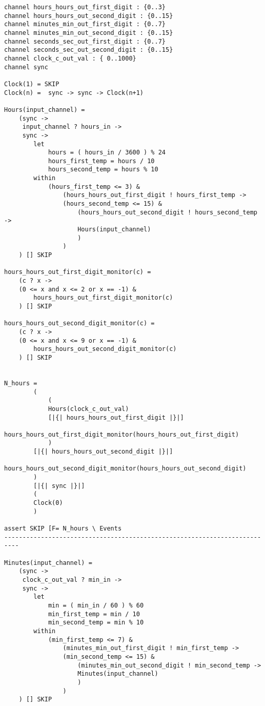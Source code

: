 
\begin{verbatim}
channel hours_hours_out_first_digit : {0..3}
channel hours_hours_out_second_digit : {0..15}
channel minutes_min_out_first_digit : {0..7}
channel minutes_min_out_second_digit : {0..15}
channel seconds_sec_out_first_digit : {0..7}
channel seconds_sec_out_second_digit : {0..15}
channel clock_c_out_val : { 0..1000}
channel sync

Clock(1) = SKIP
Clock(n) =  sync -> sync -> Clock(n+1)

Hours(input_channel) =
    (sync ->
     input_channel ? hours_in ->
     sync ->
        let
            hours = ( hours_in / 3600 ) % 24
            hours_first_temp = hours / 10
            hours_second_temp = hours % 10
        within
            (hours_first_temp <= 3) &
                (hours_hours_out_first_digit ! hours_first_temp ->
                (hours_second_temp <= 15) &
                    (hours_hours_out_second_digit ! hours_second_temp ->
                    Hours(input_channel)
                    )
                )
    ) [] SKIP

hours_hours_out_first_digit_monitor(c) =
    (c ? x ->
    (0 <= x and x <= 2 or x == -1) &
        hours_hours_out_first_digit_monitor(c)
    ) [] SKIP

hours_hours_out_second_digit_monitor(c) =
    (c ? x ->
    (0 <= x and x <= 9 or x == -1) &
        hours_hours_out_second_digit_monitor(c)
    ) [] SKIP


N_hours =
        (
            (
            Hours(clock_c_out_val)
            [|{| hours_hours_out_first_digit |}|]
            hours_hours_out_first_digit_monitor(hours_hours_out_first_digit)
            )
        [|{| hours_hours_out_second_digit |}|]
        hours_hours_out_second_digit_monitor(hours_hours_out_second_digit)
        )
        [|{| sync |}|]
        (
        Clock(0)
        )

assert SKIP [F= N_hours \ Events
--------------------------------------------------------------------------

Minutes(input_channel) =
    (sync ->
     clock_c_out_val ? min_in ->
     sync ->
        let
            min = ( min_in / 60 ) % 60
            min_first_temp = min / 10
            min_second_temp = min % 10
        within
            (min_first_temp <= 7) &
                (minutes_min_out_first_digit ! min_first_temp ->
                (min_second_temp <= 15) &
                    (minutes_min_out_second_digit ! min_second_temp ->
                    Minutes(input_channel)
                    )
                )
    ) [] SKIP


\end{verbatim}
